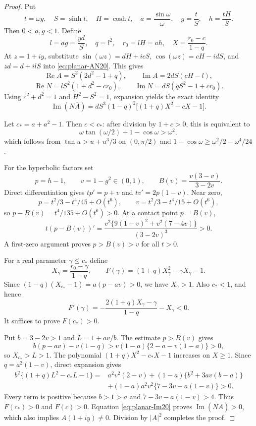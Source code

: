 \documentclass[11pt,a4paper]{article}
\theoremstyle{remark}
\numberwithin{equation}{section}
\begin{document}
\begin{proof}
Put
\[
 t=\omega y,\quad S=\sinh t,\quad H=\cosh t,\quad
 a=\frac{\sin\omega}{\omega},\quad
 g=\frac tS,\quad h=\frac{tH}{S}.
\]
Then $0<a,g<1$. Define
\[
 l=ag=\frac{yd}{S},\quad q=l^2,\quad r_0=lH=ah,\quad
 X=\frac{r_0-c}{1-q}.
\]
At $z=1+iy$, substitute
$\sin(\omega z)=dH+icS$, $\cos(\omega z)=cH-idS$, and $zd=d+ilS$
into \eqref{eq:planar-AN20}. This gives
\[
 \operatorname{Re}A=S^2(2d^2-1+q),\qquad
 \operatorname{Im}A=2dS(cH-l),
\]
\[
 \operatorname{Re}N=lS^2(1+d^2-cr_0),\qquad
 \operatorname{Im}N=dS(qS^2-1+cr_0).
\]
Using $c^2+d^2=1$ and $H^2-S^2=1$, expansion yields the exact identity
\begin{equation}\label{eq:planar-Im20}
 \operatorname{Im}(N\overline A)
 =dS^3(1-q)^2\bigl[(1+q)X^2-cX-1\bigr].
\end{equation}

Let $c_*=a+a^2-1$. Then $c<c_*$: after division by $1+c>0$, this is
equivalent to
\[
 \omega\tan(\omega/2)+1-\cos\omega>\omega^2,
\]
which follows from $\tan u>u+u^3/3$ on $(0,\pi/2)$ and
$1-\cos\omega\ge\omega^2/2-\omega^4/24$.

For the hyperbolic factors set
\[
 p=h-1,\qquad v=1-g^2\in(0,1),\qquad
 B(v)=\frac{v(3-v)}{3-2v}.
\]
Direct differentiation gives
$tp'=p+v$ and $tv'=2p(1-v)$. Near zero,
\[
 p=t^2/3-t^4/45+O(t^6),\qquad
 v=t^2/3-t^4/15+O(t^6),
\]
so $p-B(v)=t^4/135+O(t^6)>0$. At a contact point $p=B(v)$,
\[
 t(p-B(v))'
 =\frac{v^2\{9(1-v)^2+v^2(7-4v)\}}{(3-2v)^3}>0.
\]
A first-zero argument proves $p>B(v)>v$ for all $t>0$.

For a real parameter $\gamma\le c_*$ define
\[
 X_\gamma=\frac{r_0-\gamma}{1-q},\qquad
 F(\gamma)=(1+q)X_\gamma^2-\gamma X_\gamma-1.
\]
Since
$(1-q)(X_{c_*}-1)=a(p-av)>0$, we have $X_\gamma>1$.
Also $c_*<1$, and hence
\[
 F'(\gamma)
 =-\frac{2(1+q)X_\gamma-\gamma}{1-q}-X_\gamma<0.
\]
It suffices to prove $F(c_*)>0$.

Put $b=3-2v>1$ and $L=1+av/b$. The estimate $p>B(v)$ gives
\[
 b(p-av)-v(1-q)
 >v(1-a)\{2-a-v(1-a)\}>0,
\]
so $X_{c_*}>L>1$. The polynomial $(1+q)X^2-c_*X-1$ increases on
$X\ge1$. Since $q=a^2(1-v)$, direct expansion gives
\begin{align*}
 b^2\{(1+q)L^2-c_*L-1\}
 ={}&a^2v^2(2-v)+(1-a)\{b^2+3av(b-a)\}\\
 &+(1-a)a^2v^2\{7-3v-a(1-v)\}>0.
\end{align*}
Every term is positive because $b>1>a$ and
$7-3v-a(1-v)>4$. Thus $F(c_*)>0$ and $F(c)>0$.
Equation \eqref{eq:planar-Im20} proves
$\operatorname{Im}(N\overline A)>0$, which also implies $A(1+iy)\ne0$.
Division by $|A|^2$ completes the proof.
\end{proof}
\end{document}
